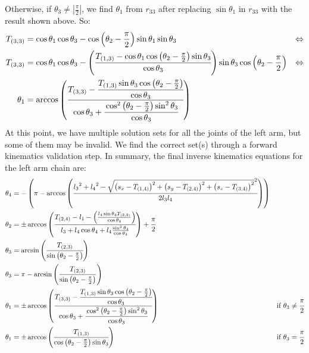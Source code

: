 Otherwise, if $\theta_3 \neq \left|\frac{\pi}{2}\right|$, we find $\theta_1$ from $r_{33}$ after replacing $\sin\theta_1$ in $r_{33}$ with the result shown above. So:
\begin{align*}
T_{(3,3)} &= \cos\theta_1\cos\theta_3 - \cos\left(\theta_2 - \frac{\pi}{2}\right)\sin\theta_1\sin\theta_3 &\Leftrightarrow \\
T_{(3,3)} &= \cos\theta_1\cos\theta_3 - \left(\cfrac{T_{(1,3)} - \cos\theta_1\cos\left(\theta_2 - \frac{\pi}{2}\right)\sin\theta_3}{\cos\theta_3}\right)\sin\theta_3\cos\left(\theta_2 - \frac{\pi}{2}\right) &\Leftrightarrow \\
\theta_1 &= \arccos\left(\cfrac{T_{(3,3)} -\cfrac{ T_{(1,3)}\sin\theta_3\cos\left(\theta_2 - \frac{\pi}{2}\right)}{\cos\theta_3}}{\cos\theta_3 + \cfrac{\cos^2\left(\theta_2-\frac{\pi}{2}\right)\sin^2\theta_3}{\cos\theta_3}}\right)
\end{align*}
At this point, we have multiple solution sets for all the joints of the left arm, but some of them may be invalid. We find the correct set(s) through a forward kinematics validation step. In summary, the final inverse kinematics equations for the left arm chain are:
\begin{align*}
\theta_4 &= -\left(\pi - \arccos\left(\cfrac{{l_3}^2 + {l_4}^2 - \sqrt{\left(s_x-T_{(1,4)}\right)^2 + \left(s_y-T_{(2,4)}\right)^2 + \left(s_z-T_{(3,4)}\right)^2}^2 }{2 l_3 l_4}\right)\right)\\
\theta_2 &= \pm\arccos\left(\cfrac{T_{(2,4)} - l_1 - \left(\frac{l_4\sin\theta_4 T_{(2,2)}}{\cos\theta_4}\right)}{l_3 +l_4\cos\theta_4 + l_4\frac{\sin^2\theta_4}{\cos\theta_4}}\right)+\cfrac{\pi}{2}\\
\theta_3 &= \arcsin\left(\cfrac{T_{(2,3)}}{\sin\left(\theta_2-\frac{\pi}{2}\right)}\right)\\
\theta_3 &= \pi - \arcsin\left(\frac{T_{(2,3)}}{\sin\left(\theta_2-\frac{\pi}{2}\right)}\right)\\
\theta_1 &= \pm\arccos\left(\cfrac{T_{(3,3)} - \cfrac{T_{(1,3)}\sin\theta_3\cos\left(\theta_2 - \frac{\pi}{2}\right)}{\cos\theta_3}}{\cos\theta_3 + \cfrac{\cos^2\left(\theta_2-\frac{\pi}{2}\right)\sin^2\theta_3}{\cos\theta_3}}\right) &\text{if } \theta_3 \neq \cfrac{\pi}{2}\\
\theta_1 &= \pm\arccos\left(\cfrac{T_{(1,3)}}{\cos\left(\theta_2 - \frac{\pi}{2}\right)\sin\theta_3}\right) &\text{if } \theta_3 = \cfrac{\pi}{2}
\end{align*}



